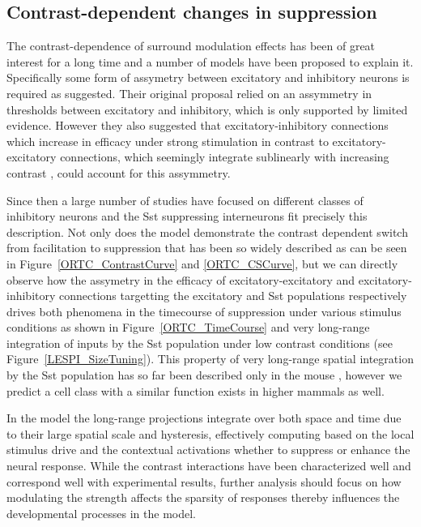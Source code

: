 \subsection{Contrast-dependent changes in suppression}

The contrast-dependence of surround modulation effects has been of
great interest for a long time and a number of models have been
proposed to explain it. Specifically some form of assymetry between
excitatory and inhibitory neurons is required as \cite{Somers1998}
suggested. Their original proposal relied on an assymmetry in
thresholds between excitatory and inhibitory, which is only supported
by limited evidence. However they also suggested that
excitatory-inhibitory connections which increase in efficacy under
strong stimulation in contrast to excitatory-excitatory connections,
which seemingly integrate sublinearly with increasing contrast
\citep{Abbott1997, Tsodyks1997}, could account for this assymmetry.

Since then a large number of studies have focused on different classes
of inhibitory neurons and the Sst suppressing interneurons fit
precisely this description. Not only does the model demonstrate the
contrast dependent switch from facilitation to suppression that has
been so widely described \citep{Levitt1997, Polat1998, Dragoi2000,
  Wang2009} as can be seen in Figure~\ref{ORTC_ContrastCurve} and
\ref{ORTC_CSCurve}, but we can directly observe how the assymetry in
the efficacy of excitatory-excitatory and excitatory-inhibitory
connections targetting the excitatory and Sst populations respectively
drives both phenomena in the timecourse of suppression under various
stimulus conditions as shown in Figure~\ref{ORTC_TimeCourse} and very
long-range integration of inputs by the Sst population under low
contrast conditions (see Figure~\ref{LESPI_SizeTuning}). This property
of very long-range spatial integration by the Sst population has so
far been described only in the mouse \citep{Adesnik2012}, however we
predict a cell class with a similar function exists in higher mammals
as well.

In the model the long-range projections integrate over both space and
time due to their large spatial scale and hysteresis, effectively
computing based on the local stimulus drive and the contextual
activations whether to suppress or enhance the neural response. While
the contrast interactions have been characterized well and correspond
well with experimental results, further analysis should focus on how
modulating the strength affects the sparsity of responses thereby
influences the developmental processes in the model.

